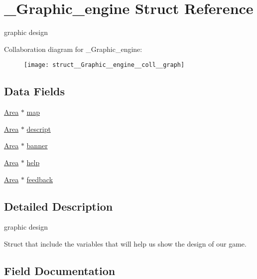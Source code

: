 \hypertarget{struct__Graphic__engine}{}\section{\+\_\+\+Graphic\+\_\+engine Struct Reference}
\label{struct__Graphic__engine}


graphic design  




Collaboration diagram for \+\_\+\+Graphic\+\_\+engine\+:
\nopagebreak
\begin{figure}[H]
\begin{center}
\leavevmode
\texttt{[image: struct\_\_Graphic\_\_engine\_\_coll\_\_graph]}
\end{center}
\end{figure}
\subsection*{Data Fields}
\begin{DoxyCompactItemize}
\item 
\hyperlink{screen_8h_acfdfc42f6522d75fa3c16713afde8127}{Area} $\ast$ \hyperlink{struct__Graphic__engine_a1ea06bb881d335da8c31d63b3e834bdb}{map}
\item 
\hyperlink{screen_8h_acfdfc42f6522d75fa3c16713afde8127}{Area} $\ast$ \hyperlink{struct__Graphic__engine_a414bb888ecce3389c7ce348264758e58}{descript}
\item 
\hyperlink{screen_8h_acfdfc42f6522d75fa3c16713afde8127}{Area} $\ast$ \hyperlink{struct__Graphic__engine_a440dfb2c23c3c4b7d3871187371117b9}{banner}
\item 
\hyperlink{screen_8h_acfdfc42f6522d75fa3c16713afde8127}{Area} $\ast$ \hyperlink{struct__Graphic__engine_ade1d3e95ad6def427f613a4a2d101875}{help}
\item 
\hyperlink{screen_8h_acfdfc42f6522d75fa3c16713afde8127}{Area} $\ast$ \hyperlink{struct__Graphic__engine_a4fc0ef353d000b20d57fb75d898c6d2d}{feedback}
\end{DoxyCompactItemize}


\subsection{Detailed Description}
graphic design 

Struct that include the variables that will help us show the design of our game. 

\subsection{Field Documentation}
